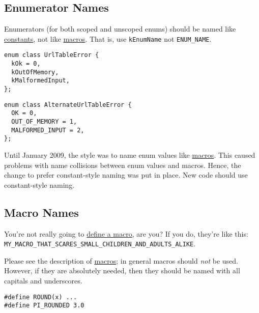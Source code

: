    \subsection{Enumerator Names}
    Enumerators (for both scoped and unscoped enums) should be named like \hyperref[subsec:constant-names]{constants}, not like \hyperref[subsec:macro-names]{macros}. That is, use \texttt{kEnumName} not \texttt{ENUM_NAME}.
\begin{verbatim}
enum class UrlTableError {
  kOk = 0,
  kOutOfMemory,
  kMalformedInput,
};
    \end{verbatim}
    \begin{verbatim}
enum class AlternateUrlTableError {
  OK = 0,
  OUT_OF_MEMORY = 1,
  MALFORMED_INPUT = 2,
};
    \end{verbatim}
    Until January 2009, the style was to name enum values like \hyperref[subsec:macro-names]{macros}. This caused problems with name collisions between enum values and macros. Hence, the change to prefer constant-style naming was put in place. New code should use constant-style naming.
    \subsection{Macro Names}\label{subsec:macro-names}
    You're not really going to \hyperref[sec:preprocessor-macros]{define a macro}, are you? If you do, they're like this: \texttt{MY_MACRO_THAT_SCARES_SMALL_CHILDREN_AND_ADULTS_ALIKE}.

    Please see the description of \hyperref[sec:preprocessor-macros]{macros}; in general macros should \emph{not} be used. However, if they are absolutely needed, then they should be named with all capitals and underscores.
\begin{verbatim}
#define ROUND(x) ...
#define PI_ROUNDED 3.0
    \end{verbatim}
